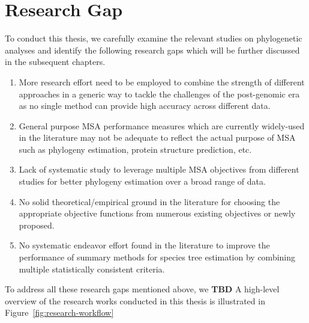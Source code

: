 \section{Research Gap}
To conduct this thesis, we carefully examine the relevant studies on phylogenetic analyses and identify the following research gaps which will be further discussed in the subsequent chapters.
\begin{enumerate}
	\item  More research effort need to be employed to combine the strength of different approaches in a generic way to tackle the challenges of the post-genomic era as no single method can provide high accuracy across different data. 
	
	
	\item  General purpose MSA performance measures which are currently widely-used in the literature may not be adequate to reflect the actual purpose of MSA such as phylogeny estimation, protein structure prediction, etc.
	
	
	\item  Lack of systematic study to leverage multiple MSA objectives from different studies for better phylogeny estimation over a broad range of data.
	
	
	\item  No solid theoretical/empirical ground in the literature for choosing the appropriate objective functions from numerous existing objectives  or newly proposed.
	
	
	\item No systematic endeavor effort found in the literature to improve the performance of summary methods for species tree estimation by combining multiple statistically consistent criteria.
\end{enumerate}

To address all these research gaps mentioned above, we \textbf{TBD}
A high-level overview of the research works conducted in this thesis is illustrated in Figure~\ref{fig:research-workflow}

